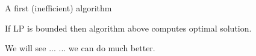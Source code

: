 \begin{frame}{A first (inefficient) algorithm}


  \begin{theorem}
    If LP is bounded then algorithm above computes optimal solution. 
  \end{theorem}


  \begin{alertblock}{We will see ...}
    ... we can do much better. 
  \end{alertblock}
  \begin{columns}
    \begin{column}{.5\textwidth}
      
    \end{column}
    \begin{column}{.5\textwidth}
      
    \end{column}       
  \end{columns}
\end{frame}







